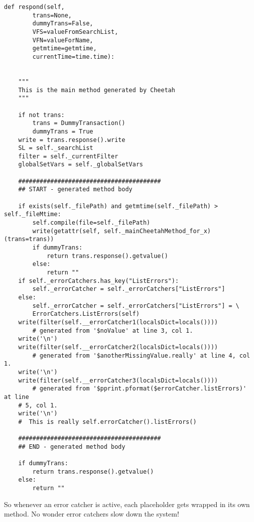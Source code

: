 \begin{verbatim}
def respond(self,
        trans=None,
        dummyTrans=False,
        VFS=valueFromSearchList,
        VFN=valueForName,
        getmtime=getmtime,
        currentTime=time.time):


    """
    This is the main method generated by Cheetah
    """

    if not trans:
        trans = DummyTransaction()
        dummyTrans = True
    write = trans.response().write
    SL = self._searchList
    filter = self._currentFilter
    globalSetVars = self._globalSetVars
    
    ########################################
    ## START - generated method body
    
    if exists(self._filePath) and getmtime(self._filePath) > self._fileMtime:
        self.compile(file=self._filePath)
        write(getattr(self, self._mainCheetahMethod_for_x)(trans=trans))
        if dummyTrans:
            return trans.response().getvalue()
        else:
            return ""
    if self._errorCatchers.has_key("ListErrors"):
        self._errorCatcher = self._errorCatchers["ListErrors"]
    else:
        self._errorCatcher = self._errorCatchers["ListErrors"] = \
	    ErrorCatchers.ListErrors(self)
    write(filter(self.__errorCatcher1(localsDict=locals()))) 
        # generated from '$noValue' at line 3, col 1.
    write('\n')
    write(filter(self.__errorCatcher2(localsDict=locals()))) 
        # generated from '$anotherMissingValue.really' at line 4, col 1.
    write('\n')
    write(filter(self.__errorCatcher3(localsDict=locals()))) 
        # generated from '$pprint.pformat($errorCatcher.listErrors)' at line 
	# 5, col 1.
    write('\n')
    #  This is really self.errorCatcher().listErrors()
    
    ########################################
    ## END - generated method body
    
    if dummyTrans:
        return trans.response().getvalue()
    else:
        return ""
\end{verbatim}

So whenever an error catcher is active, each placeholder gets wrapped in its
own method.  No wonder error catchers slow down the system!


